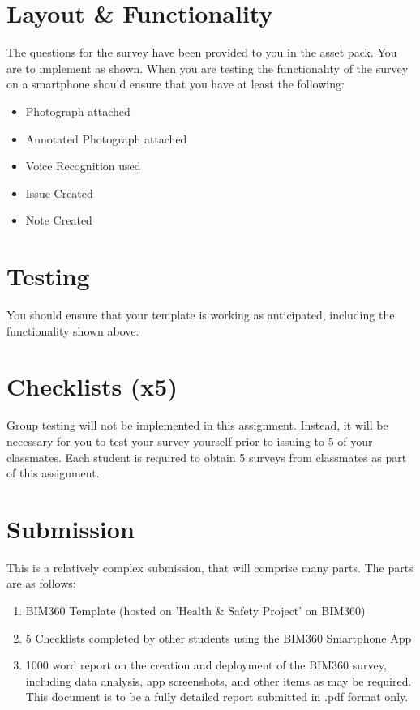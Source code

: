 \newpage
\section*{Layout \& Functionality}

The questions for the survey have been provided to you in the asset pack.  You are to implement as shown.  When you are testing the functionality of the survey on a smartphone should ensure that you have at least the following:

\begin{itemize}
	\item Photograph attached
	\item Annotated Photograph attached
	\item Voice Recognition used
	\item Issue Created
	\item Note Created
\end{itemize}

\section*{Testing}
You should ensure that your template is working as anticipated, including the functionality shown above.


\newpage
\section*{Checklists (x5)}
Group testing will not be implemented in this assignment.  Instead, it will be necessary for you to test your survey yourself prior to issuing to 5 of your classmates.  Each student is required to obtain 5 surveys from classmates as part of this assignment.


\section*{Submission}
This is a relatively complex submission, that will comprise many parts.  The parts are as follows:
\begin{enumerate}
	\item BIM360 Template (hosted on 'Health \& Safety Project' on BIM360)
	\item 5 Checklists completed by other students using the BIM360 Smartphone App
	\item 1000 word report on the creation and deployment of the BIM360 survey, including data analysis, app screenshots, and other items as may be required.  This document is to be a fully detailed report submitted in .pdf format only.
\end{enumerate}



